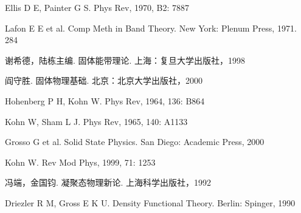 \begin{canKao}
\begin{enumerate}[label={[\arabic*]}, leftmargin=2.2em, itemsep=0pt]
\item Ellis D E, Painter G S. Phys Rev, 1970, B2: 7887
\item Lafon E E et al. Comp Meth in Band Theory. New York: Plenum Press, 1971. 284
\item 谢希德，陆栋主编. 固体能带理论. 上海：复旦大学出版社，1998
\item 阎守胜. 固体物理基础. 北京：北京大学出版社，2000
\item Hohenberg P H, Kohn W. Phys Rev, 1964, 136: B864
\item Kohn W, Sham L J. Phys Rev, 1965, 140: A1133
\item Grosso G et al. Solid State Physics. San Diego: Academic Press, 2000
\item Kohn W. Rev Mod Phys, 1999, 71: 1253
\item 冯端，金国钧. 凝聚态物理新论. 上海科学出版社，1992
\item Driezler R M, Gross E K U. Density Functional Theory. Berlin: Spinger, 1990
\end{enumerate}
\end{canKao}
